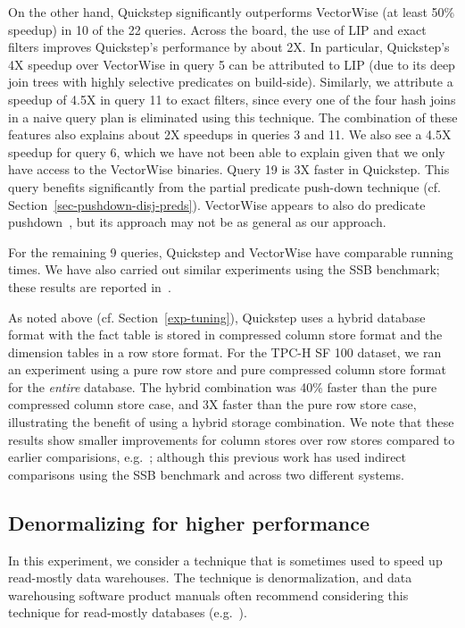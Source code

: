 On the other hand, Quickstep significantly outperforms VectorWise (at least 50\% speedup) in 10 of the 22 queries. Across the board, the use of LIP and exact filters improves Quickstep's performance by about 2X. In particular, Quickstep's 4X speedup over VectorWise in query 5 can be attributed to LIP (due to its deep join trees with highly selective predicates on build-side). Similarly, we attribute a speedup of 4.5X in query 11 to exact filters, since every one of the four hash joins in a naive query plan is eliminated using this technique. The combination of these features also explains about 2X speedups in queries 3 and 11. We also see a 4.5X speedup for query 6, which we have not been able to explain given that we only have access to the VectorWise binaries. Query 19 is 3X faster in Quickstep. This query benefits significantly from the partial predicate push-down technique  (cf. Section~\ref{sec-pushdown-disj-preds}). VectorWise appears to also do predicate pushdown~\cite{BonczNE13}, but its approach may not be as general as our approach.

For the remaining 9 queries, Quickstep and VectorWise have comparable running times.
We have also carried out similar experiments using the SSB benchmark; these results are reported in~\cite{patel1quickstep}.

As noted above (cf. Section~\ref{exp-tuning}), Quickstep uses a hybrid database format with the fact table is stored in compressed column store format and the dimension tables in a row store format. For the TPC-H SF 100 dataset, we ran an experiment using a pure row store and pure compressed column store format for the \textit{entire} database. The hybrid combination was 40\% faster than the pure compressed column store case, and 3X faster than the pure row store case, illustrating the benefit of using a hybrid storage combination. We note that these results show smaller improvements for column stores over row stores compared to earlier comparisions, e.g.~\cite{DBLP:conf/sigmod/AbadiMH08}; although this previous work has used indirect comparisons using the SSB benchmark and across two different systems.

\subsection{Denormalizing for higher performance}
\label{denormalizing}
In this experiment, we consider a technique that is sometimes used to speed up read-mostly data warehouses. The technique is denormalization, and data warehousing software product manuals often recommend considering this technique for read-mostly databases (e.g.~\cite{denorm-SQL, denorm-IBM, denorm-sybase}).

